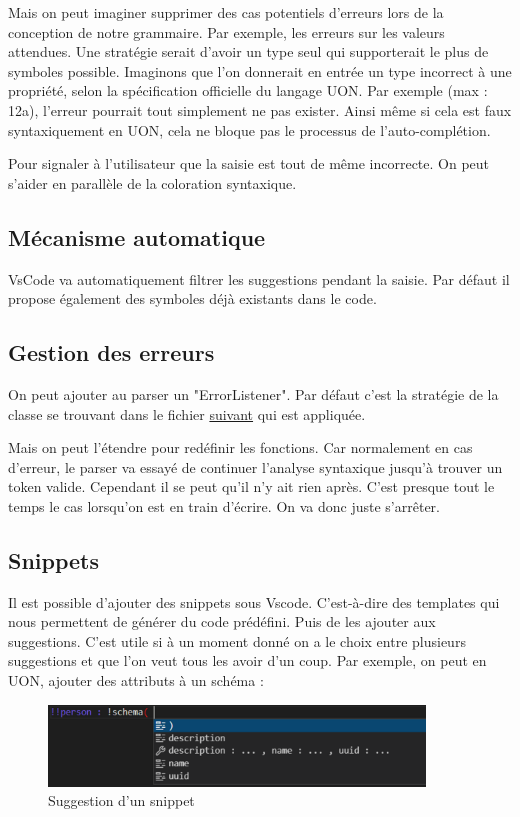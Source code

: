 \documentclass[
    iict, %
    il, %
]{heig-tb}
\begin{document}
Mais on peut imaginer supprimer des cas potentiels d'erreurs lors de la conception de notre grammaire.
Par exemple, les erreurs sur les valeurs attendues. Une stratégie serait d'avoir un type seul qui supporterait le plus de symboles possible.
Imaginons que l'on donnerait en entrée un type incorrect à une propriété, selon la spécification officielle du langage UON.
Par exemple (max : 12a), l'erreur pourrait tout simplement ne pas exister.
Ainsi même si cela est faux syntaxiquement en UON, cela ne bloque pas le processus de l'auto-complétion.

Pour signaler à l'utilisateur que la saisie est tout de même incorrecte. On peut s'aider en parallèle de la coloration syntaxique.

\subsection{Mécanisme automatique}
VsCode va automatiquement filtrer les suggestions pendant la saisie.
Par défaut il propose également des symboles déjà existants dans le code.

\subsection{Gestion des erreurs}\label{error handle}
On peut ajouter au parser un "ErrorListener".
Par défaut c'est la stratégie de la classe se trouvant dans le fichier \href{https://github.com/tunnelvisionlabs/antlr4ts/blob/master/src/DefaultErrorStrategy.ts}{suivant} qui est appliquée.

Mais on peut l'étendre pour redéfinir les fonctions.
Car normalement en cas d'erreur, le parser va essayé de continuer l'analyse syntaxique jusqu'à trouver un token valide.
Cependant il se peut qu'il n'y ait rien après. C'est presque tout le temps le cas lorsqu'on est en train d'écrire.
On va donc juste s'arrêter.

\subsection{Snippets}
Il est possible d'ajouter des snippets sous Vscode. C'est-à-dire des templates qui nous permettent de générer du code prédéfini. Puis de les ajouter aux suggestions.
C'est utile si à un moment donné on a le choix entre plusieurs suggestions et que l'on veut tous les avoir d'un coup.
Par exemple, on peut en UON, ajouter des attributs à un schéma :

\begin{figure}[!h]
    \begin{center}
        \includegraphics[width=10cm]{assets/figures/snippet-suggestion.png}
    \end{center}
    \caption[Suggestion d'un snippet]{\label{snippet-suggestion} Suggestion d'un snippet}
\end{figure}
\end{document}

